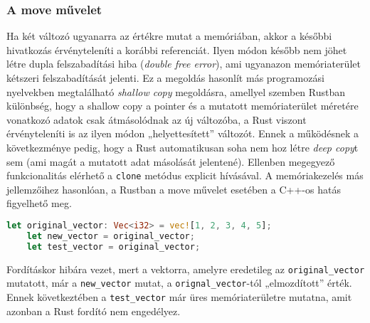 \subsubsection{A move művelet}

Ha két változó ugyanarra az értékre mutat a memóriában, akkor a későbbi hivatkozás érvényteleníti a korábbi referenciát. Ilyen módon később nem jöhet létre dupla felszabadítási hiba (\textit{double free error}), ami ugyanazon memóriaterület kétszeri felszabadítását jelenti. Ez a megoldás hasonlít más programozási nyelvekben megtalálható \textit{shallow copy} megoldásra, amellyel szemben Rustban különbség, hogy a shallow copy a pointer és a mutatott memóriaterület méretére vonatkozó adatok csak átmásolódnak az új változóba, a Rust viszont érvényteleníti is az ilyen módon „helyettesített” változót. Ennek a működésnek a következménye pedig, hogy a Rust automatikusan soha nem hoz létre \textit{deep copy}t sem (ami magát a mutatott adat másolását jelentené). Ellenben megegyező funkcionalitás elérhető a \lstinline{clone} metódus explicit hívásával. A memóriakezelés más jellemzőihez hasonlóan, a Rustban a move művelet esetében a C++-os hatás figyelhető meg.
\begin{lstlisting}[language=Rust, style=boxed]
    let original_vector: Vec<i32> = vec![1, 2, 3, 4, 5];
    let new_vector = original_vector;
    let test_vector = original_vector;
\end{lstlisting}
Fordításkor hibára vezet, mert a vektorra, amelyre eredetileg az \lstinline{original_vector} mutatott,  már a \lstinline{new_vector} mutat, a \lstinline{orignal_vector}-tól „elmozdított” érték. Ennek következtében a \lstinline{test_vector} már üres memóriaterületre mutatna, amit azonban a Rust fordító nem engedélyez.


